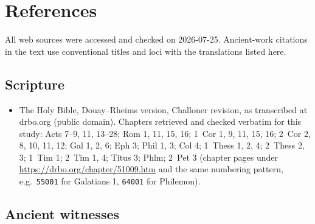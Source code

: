 \section{References}

\begingroup
\raggedright

All web sources were accessed and checked on 2026-07-25. Ancient-work
citations in the text use conventional titles and loci with the
translations listed here.

\subsection*{Scripture}

\begin{itemize}
\item The Holy Bible, Douay--Rheims version, Challoner revision, as
transcribed at drbo.org (public domain). Chapters retrieved and checked
verbatim for this study: Acts 7--9, 11, 13--28; Rom 1, 11, 15, 16;
1~Cor 1, 9, 11, 15, 16; 2~Cor 2, 8, 10, 11, 12; Gal 1, 2, 6; Eph 3;
Phil 1, 3; Col 4; 1~Thess 1, 2, 4; 2~Thess 2, 3; 1~Tim 1; 2~Tim 1, 4;
Titus 3; Phlm; 2~Pet 3 (chapter pages under
\url{https://drbo.org/chapter/51009.htm} and the same numbering pattern,
e.g.\ \texttt{55001} for Galatians 1, \texttt{64001} for Philemon).
\end{itemize}

\subsection*{Ancient witnesses}


